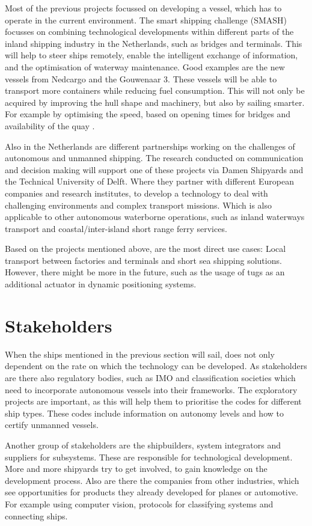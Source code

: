 Most of the previous projects focussed on developing a vessel, which has to operate in the current environment. The smart shipping challenge (SMASH) focusses on combining technological developments within different parts of the inland shipping industry in the Netherlands, such as bridges and terminals. This will help to steer ships remotely, enable the intelligent exchange of information, and the optimisation of waterway maintenance.
Good examples are the new vessels from Nedcargo and the Gouwenaar 3. These vessels will be able to transport more containers while reducing fuel consumption. This will not only be acquired by improving the hull shape and machinery, but also by sailing smarter. For example by optimising the speed, based on opening times for bridges and availability of the quay \cite{SMASH2017}. 

Also in the Netherlands are different partnerships working on the challenges of autonomous and unmanned shipping. The research conducted on communication and decision making will support one of these projects via Damen Shipyards and the Technical University of Delft. Where they partner with different European companies and research institutes, to develop a technology to deal with challenging environments and complex transport missions. Which is also applicable to other autonomous waterborne operations, such as inland waterways transport and coastal/inter-island short range ferry services.

Based on the projects mentioned above, are the most direct use cases: Local transport between factories and terminals and short sea shipping solutions. However, there might be more in the future, such as the usage of tugs as an additional actuator in dynamic positioning systems.

\section{Stakeholders}
When the ships mentioned in the previous section will sail, does not only dependent on the rate on which the technology can be developed. As stakeholders are there also regulatory bodies, such as \ac{IMO} and classification societies which need to incorporate autonomous vessels into their frameworks. 
The exploratory projects are important, as this will help them to prioritise the codes for different ship types. These codes include information on autonomy levels and how to certify unmanned vessels.

Another group of stakeholders are the shipbuilders, system integrators and suppliers for subsystems. These are responsible for technological development. More and more shipyards try to get involved, to gain knowledge on the development process. 
Also are there the companies from other industries, which see opportunities for products they already developed for planes or automotive. For example using computer vision, protocols for classifying systems and connecting ships.

